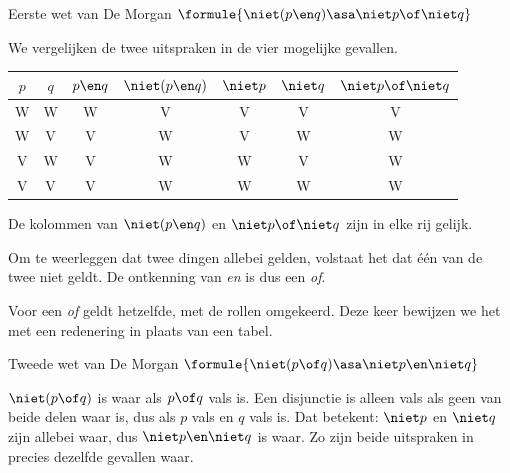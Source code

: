 \begin{theorie}
\begin{stelling}{Eerste wet van De Morgan}
\qquad $\formule{\niet(p \en q) \asa \niet p \of \niet q}$
\end{stelling}

\begin{bewijs}
We vergelijken de twee uitspraken in de vier mogelijke gevallen.

\vspace{1mm}
{\centering{}\renewcommand{\arraystretch}{1.2}%
\begin{tabular}{|c|c|c|c|c|c|c|}\hline
$p$ & $q$ & $p \en q$ & $\niet(p \en q)$ & $\niet p$ & $\niet q$ & $\niet p \of \niet q$ \\ \hline
W & W & W & V & V & V & V \\ \hline
W & V & V & W & V & W & W \\ \hline
V & W & V & W & W & V & W \\ \hline
V & V & V & W & W & W & W \\ \hline
\end{tabular}\par}

\vspace{1mm}
De kolommen van $\niet(p \en q)$ en $\niet p \of \niet q$ zijn in elke rij gelijk.
\end{bewijs}
\end{theorie}

Om te weerleggen dat twee dingen allebei gelden, volstaat het dat één van de twee niet geldt. De ontkenning van \textit{en} is dus een \textit{of}.


Voor een \textit{of} geldt hetzelfde, met de rollen omgekeerd. Deze keer bewijzen we het met een redenering in plaats van een tabel.

\begin{theorie}
\begin{stelling}{Tweede wet van De Morgan}
\qquad $\formule{\niet(p \of q) \asa \niet p \en \niet q}$
\end{stelling}

\begin{bewijs}
$\niet(p \of q)$ is waar als $p \of q$ vals is. Een disjunctie is alleen vals als geen van beide delen waar is, dus als $p$ vals en $q$ vals is. Dat betekent: $\niet p$ en $\niet q$ zijn allebei waar, dus $\niet p \en \niet q$ is waar. Zo zijn beide uitspraken in precies dezelfde gevallen waar.
\end{bewijs}
\end{theorie}

